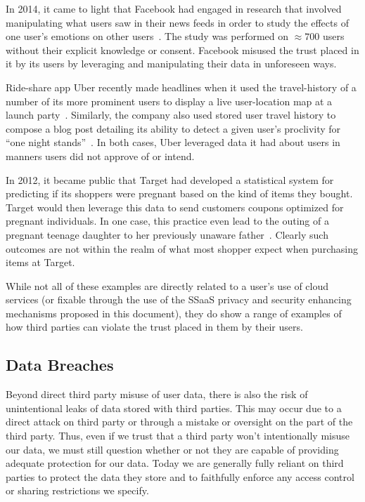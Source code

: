 \begin{packed_desc}
\item[Facebook Emotional Contagion Study:] In 2014, it came to light
  that Facebook had engaged in research that involved manipulating
  what users saw in their news feeds in order to study the effects of
  one user's emotions on other users~\cite{goel2014}. The study was
  performed on $\approx700$ users without their explicit knowledge or
  consent. Facebook misused the trust placed in it by its users by
  leveraging and manipulating their data in unforeseen ways.
\item[Uber User Travel History:] Ride-share app Uber recently made
  headlines when it used the travel-history of a number of its more
  prominent users to display a live user-location map at a launch
  party~\cite{sims2014}. Similarly, the company also used stored user
  travel history to compose a blog post detailing its ability to
  detect a given user's proclivity for ``one night
  stands''~\cite{pagliery2014}. In both cases, Uber leveraged data it
  had about users in manners users did not approve of or intend.
\item[Target Pregnancy Prediction:] In 2012, it became public that
  Target had developed a statistical system for predicting if its
  shoppers were pregnant based on the kind of items they
  bought. Target would then leverage this data to send customers
  coupons optimized for pregnant individuals. In one case, this
  practice even lead to the outing of a pregnant teenage daughter to
  her previously unaware father~\cite{hill2012}. Clearly such outcomes
  are not within the realm of what most shopper expect when purchasing
  items at Target.
\end{packed_desc}

While not all of these examples are directly related to a user's use
of cloud services (or fixable through the use of the SSaaS privacy and
security enhancing mechanisms proposed in this document), they do show
a range of examples of how third parties can violate the trust placed
in them by their users.

\subsection{Data Breaches}

Beyond direct third party misuse of user data, there is also the risk
of unintentional leaks of data stored with third parties. This may
occur due to a direct attack on third party or through a mistake or
oversight on the part of the third party. Thus, even if we trust that
a third party won't intentionally misuse our data, we must still
question whether or not they are capable of providing adequate
protection for our data. Today we are generally fully reliant on third
parties to protect the data they store and to faithfully enforce any
access control or sharing restrictions we specify.

